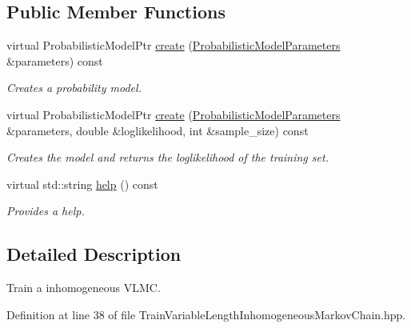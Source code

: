 \subsection*{Public Member Functions}
\begin{DoxyCompactItemize}
\item 
virtual Probabilistic\+Model\+Ptr \hyperlink{classtops_1_1TrainVariableLengthInhomogeneousMarkovChain_a1a0e7cada3c58961aa186904214a6dac}{create} (\hyperlink{classtops_1_1ProbabilisticModelParameters}{Probabilistic\+Model\+Parameters} \&parameters) const
\begin{DoxyCompactList}\small\item\em Creates a probability model. \end{DoxyCompactList}\item 
\mbox{\label{classtops_1_1TrainVariableLengthInhomogeneousMarkovChain_af463e2df09043b1505d4dc9de4c5a749}} 
virtual Probabilistic\+Model\+Ptr \hyperlink{classtops_1_1TrainVariableLengthInhomogeneousMarkovChain_af463e2df09043b1505d4dc9de4c5a749}{create} (\hyperlink{classtops_1_1ProbabilisticModelParameters}{Probabilistic\+Model\+Parameters} \&parameters, double \&loglikelihood, int \&sample\+\_\+size) const
\begin{DoxyCompactList}\small\item\em Creates the model and returns the loglikelihood of the training set. \end{DoxyCompactList}\item 
\mbox{\label{classtops_1_1TrainVariableLengthInhomogeneousMarkovChain_ac3f922be58ed8b1b15c828bfe714134c}} 
virtual std\+::string \hyperlink{classtops_1_1TrainVariableLengthInhomogeneousMarkovChain_ac3f922be58ed8b1b15c828bfe714134c}{help} () const
\begin{DoxyCompactList}\small\item\em Provides a help. \end{DoxyCompactList}\end{DoxyCompactItemize}


\subsection{Detailed Description}
Train a inhomogeneous V\+L\+MC. 

Definition at line 38 of file Train\+Variable\+Length\+Inhomogeneous\+Markov\+Chain.\+hpp.



